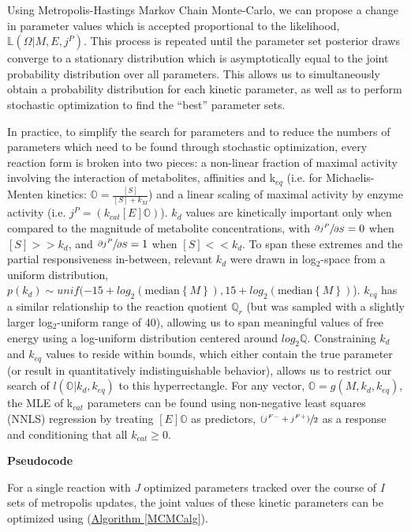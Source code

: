 Using Metropolis-Hastings Markov Chain Monte-Carlo, we can propose a change in parameter values which is accepted proportional to the likelihood, $\mathbb{L}(\Omega | M, E, j^{P})$.  This process is repeated until the parameter set posterior draws converge to a stationary distribution which is asymptotically equal to the joint probability distribution over all parameters.  This allows us to simultaneously obtain a probability distribution for each kinetic parameter, as well as to perform stochastic optimization to find the ``best'' parameter sets.

In practice, to simplify the search for parameters and to reduce the numbers of parameters which need to be found through stochastic optimization, every reaction form is broken into two pieces: a non-linear fraction of maximal activity involving the interaction of metabolites, affinities and k$_{eq}$ (i.e. for Michaelis-Menten kinetics: $\mathbb{O} = \frac{[S]}{[S] + k_{M}}$) and a linear scaling of maximal activity by enzyme activity (i.e. $j^{P} = (k_{cat}[E]\mathbb{O})$).  $k_{d}$ values are kinetically important only when compared to the magnitude of metabolite concentrations, with $\sfrac{\partial j^{P}}{\partial S} = 0$ when $[S] >> k_{d}$, and $\sfrac{\partial j^{P}}{\partial S} = 1$ when $[S] << k_{d}$.  To span these extremes and the partial responsiveness in-between, relevant $k_{d}$ were drawn in log$_{2}$-space from a uniform distribution, $p(k_{d}) \sim unif(-15 + log_{2}(\text{median}\left\{M\right\}), 15 + log_{2}(\text{median}\left\{M\right\})$).  $k_{eq}$ has a similar relationship to the reaction quotient $\mathbb{Q}_{r}$ (but was sampled with a slightly larger log$_{2}$-uniform range of 40), allowing us to span meaningful values of free energy using a log-uniform distribution centered around $log_{2}\mathbb{Q}$.  Constraining $k_{d}$ and $k_{eq}$ values to reside within bounds, which either contain the true parameter (or result in quantitatively indistinguishable behavior), allows us to restrict our search of $l(\mathbb{O}|k_{d}, k_{eq})$ to this hyperrectangle.  For any vector, $\mathbb{O} = g(M, k_{d}, k_{eq})$, the MLE of k$_{cat}$ parameters can be found using non-negative least squares (NNLS) regression by treating $[E]\mathbb{O}$ as predictors, $\sfrac{(j^{F-} + j^{F+})}{2}$ as a response and conditioning that all $k_{cat} \ge 0$.

\textbf{Pseudocode}

For a single reaction with \textit{J} optimized parameters tracked over the course of \textit{I} sets of metropolis updates, the joint values of these kinetic parameters can be optimized using (\hyperref[MCMCalg]{Algorithm \ref{MCMCalg}}).

